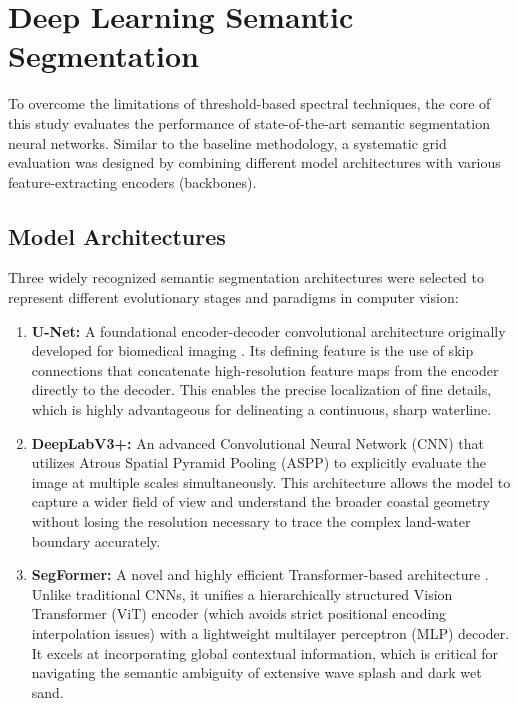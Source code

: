 ﻿\documentclass[ENG]{TFUOC}%
\begin{document}
\section{Deep Learning Semantic Segmentation} \label{sec:dl_models}

To overcome the limitations of threshold-based spectral techniques, the core of this study evaluates the performance of state-of-the-art semantic segmentation neural networks. Similar to the baseline methodology, a systematic grid evaluation was designed by combining different model architectures with various feature-extracting encoders (backbones).

\subsection{Model Architectures}

Three widely recognized semantic segmentation architectures were selected to represent different evolutionary stages and paradigms in computer vision:
\begin{enumerate}
    \item \textbf{U-Net:} A foundational encoder-decoder convolutional architecture originally developed for biomedical imaging \citep{navab_u-net_2015}. Its defining feature is the use of skip connections that concatenate high-resolution feature maps from the encoder directly to the decoder. This enables the precise localization of fine details, which is highly advantageous for delineating a continuous, sharp waterline.
    \item \textbf{DeepLabV3+:} An advanced Convolutional Neural Network (CNN) \citep{chen_encoder-decoder_2018} that utilizes Atrous Spatial Pyramid Pooling (ASPP) to explicitly evaluate the image at multiple scales simultaneously. This architecture allows the model to capture a wider field of view and understand the broader coastal geometry without losing the resolution necessary to trace the complex land-water boundary accurately.
    \item \textbf{SegFormer:} A novel and highly efficient Transformer-based architecture \citep{xie_segformer_2021}. Unlike traditional CNNs, it unifies a hierarchically structured Vision Transformer (ViT) encoder (which avoids strict positional encoding interpolation issues) with a lightweight multilayer perceptron (MLP) decoder. It excels at incorporating global contextual information, which is critical for navigating the semantic ambiguity of extensive wave splash and dark wet sand.
\end{enumerate}
\end{document}
